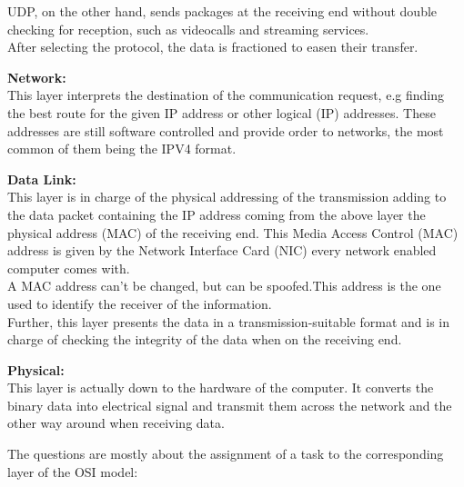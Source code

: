 {\begin{mune}
		UDP, on the other hand, sends packages at the receiving end without double checking for reception, such as videocalls and streaming services.\\
		After selecting the protocol, the data is fractioned to easen their transfer. 
\item \textbf{Network:}\\
		This layer interprets the destination of the communication request, e.g finding the best route for the given IP address or other logical (IP) addresses. These addresses are still software controlled and provide order to networks, the most common of them being the IPV4 format. 
\item \textbf{Data Link:}\\
		This layer is in charge of the physical addressing of the transmission adding to the data packet containing the IP address coming from the above layer the physical address (MAC) of the receiving end. This Media Access Control (MAC) address is given by the Network Interface Card (NIC) every network enabled computer comes with.\\
		A MAC address can't be changed, but can be spoofed.This address is the one used to identify the receiver of the information.\\
		Further, this layer presents the data in a transmission-suitable format and is in charge of checking the integrity of the data when on the receiving end.
\item \textbf{Physical:}\\
		This layer is actually down to the hardware of the computer. It converts the binary data into electrical signal and transmit them across the network and the other way around when receiving data. 
\end{mune}
The questions are mostly about the assignment of a task to the corresponding layer of the OSI model:\\
}

